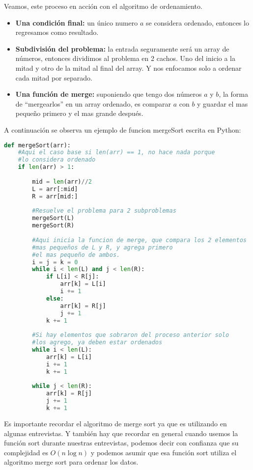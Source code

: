 Veamos, este proceso en acción con el algoritmo de ordenamiento. 

\begin{itemize}
    \item \textbf{Una condición final:} un único numero $a$ se considera ordenado, entonces lo regresamos como resultado.
    \item \textbf{Subdivisión del problema:} la entrada seguramente será un array de números,  entonces dividimos al problema en 2 cachos. Uno del inicio a la mitad y otro de la mitad al final del array. Y nos enfocamos solo a ordenar cada mitad por separado.
    \item \textbf{Una función de merge:} suponiendo que tengo dos números $a$ y $b$, la forma de ``mergearlos'' en un array ordenado, es comparar $a$ con $b$ y guardar el mas pequeño primero y el mas grande después. 
\end{itemize}

A continuación se observa un ejemplo de funcion mergeSort escrita en Python:
\begin{lstlisting}[language=Python, caption=Merge sort]
def mergeSort(arr):
    #Aqui el caso base si len(arr) == 1, no hace nada porque
    #lo considera ordenado
    if len(arr) > 1:
  
        mid = len(arr)//2
        L = arr[:mid]
        R = arr[mid:]
 
        #Resuelve el problema para 2 subproblemas       
        mergeSort(L)
        mergeSort(R)
  
        #Aqui inicia la funcion de merge, que compara los 2 elementos
        #mas pequeños de L y R, y agrega primero 
        #el mas pequeño de ambos.
        i = j = k = 0
        while i < len(L) and j < len(R):
            if L[i] < R[j]:
                arr[k] = L[i]
                i += 1
            else:
                arr[k] = R[j]
                j += 1
            k += 1
  
        #Si hay elementos que sobraron del proceso anterior solo
        #los agrego, ya deben estar ordenados
        while i < len(L):
            arr[k] = L[i]
            i += 1
            k += 1
  
        while j < len(R):
            arr[k] = R[j]
            j += 1
            k += 1
\end{lstlisting}

Es importante recordar el algoritmo de merge sort ya que es utilizando en algunas entrevistas. Y también hay que recordar en general cuando usemos la función sort durante nuestras entrevistas, podemos decir con confianza que su complejidad es $O(n\log n)$ y podemos asumir que esa función sort utiliza el algoritmo merge sort para ordenar los datos.

